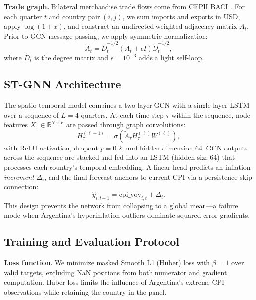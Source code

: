 \documentclass[12pt,a4paper]{article}
\begin{document}
\textbf{Trade graph.}
Bilateral merchandise trade flows come from CEPII BACI \citep{cepiibaci2026}.
For each quarter $t$ and country pair $(i,j)$, we sum imports and exports in USD, apply $\log(1+x)$, and construct an undirected weighted adjacency matrix $A_t$.
Prior to GCN message passing, we apply symmetric normalization:
\begin{equation}
  \tilde{A}_t = \tilde{D}_t^{-1/2} (A_t + \epsilon I) \tilde{D}_t^{-1/2},
\end{equation}
where $\tilde{D}_t$ is the degree matrix and $\epsilon=10^{-3}$ adds a light self-loop.

\subsection{ST-GNN Architecture}

The spatio-temporal model combines a two-layer GCN with a single-layer LSTM over a sequence of $L=4$ quarters.
At each time step $\tau$ within the sequence, node features $X_\tau \in \mathbb{R}^{N \times F}$ are passed through graph convolutions:
\begin{equation}
  H^{(\ell+1)}_\tau = \sigma\!\left(\tilde{A}_\tau H^{(\ell)}_\tau W^{(\ell)}\right),
\end{equation}
with ReLU activation, dropout $p=0.2$, and hidden dimension 64.
GCN outputs across the sequence are stacked and fed into an LSTM (hidden size 64) that processes each country's temporal embedding.
A linear head predicts an inflation \emph{increment} $\Delta_i$, and the final forecast anchors to current CPI via a persistence skip connection:
\begin{equation}
  \hat{y}_{i,t+1} = \text{cpi\_yoy}_{i,t} + \Delta_i.
  \label{eq:persistence}
\end{equation}
This design prevents the network from collapsing to a global mean---a failure mode when Argentina's hyperinflation outliers dominate squared-error gradients.

\subsection{Training and Evaluation Protocol}

\textbf{Loss function.}
We minimize masked Smooth L1 (Huber) loss with $\beta=1$ over valid targets, excluding NaN positions from both numerator and gradient computation.
Huber loss limits the influence of Argentina's extreme CPI observations while retaining the country in the panel.
\end{document}
